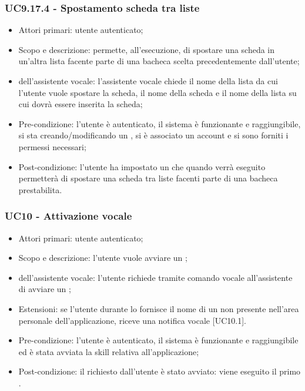 \subsubsection{UC9.17.4 - Spostamento scheda tra liste }
\begin{itemize}
	\item  Attori primari: utente autenticato;
	\item  Scopo e descrizione: permette, all'esecuzione, di spostare una scheda in un'altra lista facente parte di una bacheca scelta precedentemente dall'utente;
	\item  {} dell'assistente vocale: l'assistente vocale chiede il nome della lista da cui l'utente vuole spostare la scheda, il nome della scheda e il nome della lista su cui dovrà essere inserita la scheda;
	\item  Pre-condizione: l'utente è autenticato, il sistema è funzionante e raggiungibile, si sta creando/modificando un , si è associato un account  e si sono forniti i permessi necessari;
	\item  Post-condizione: l'utente ha impostato un  che quando verrà eseguito permetterà di spostare una scheda tra liste facenti parte di una bacheca prestabilita.
\end{itemize}

\subsubsection{UC10 - Attivazione vocale }
\begin{itemize}
	\item Attori primari: utente autenticato;
	\item Scopo e descrizione: l'utente vuole avviare un ;
	\item {} dell'assistente vocale: l'utente richiede tramite comando vocale all'assistente   di avviare un ;
	\item Estensioni:
		se l'utente durante lo  fornisce il nome di un  non presente nell'area personale dell'applicazione, riceve una notifica vocale [UC10.1].
	\item Pre-condizione: l'utente è autenticato, il sistema è funzionante e raggiungibile ed è stata avviata la skill relativa all'applicazione;
	\item Post-condizione: il  richiesto dall'utente è stato avviato: viene eseguito il primo .
\end{itemize}


